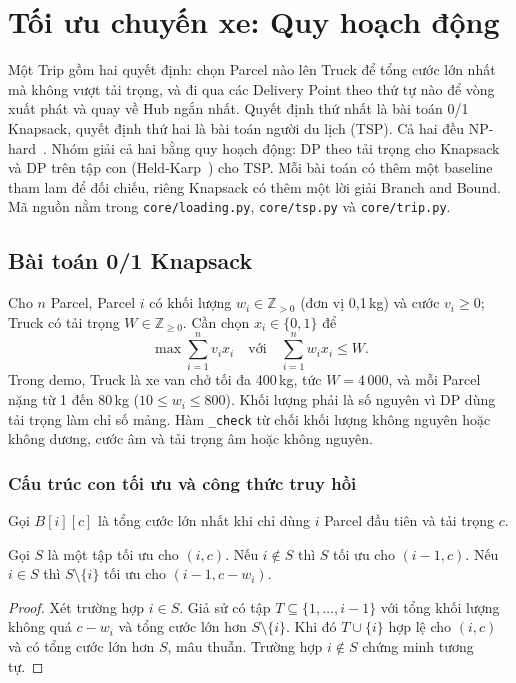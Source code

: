 \section{Tối ưu chuyến xe: Quy hoạch động}\label{sec:dp}

Một Trip gồm hai quyết định: chọn Parcel nào lên Truck để tổng cước lớn nhất mà không vượt tải trọng, và đi qua các Delivery Point theo thứ tự nào để vòng xuất phát và quay về Hub ngắn nhất. Quyết định thứ nhất là bài toán 0/1 Knapsack, quyết định thứ hai là bài toán người du lịch (TSP). Cả hai đều NP-hard~\cite{clrs2022}. Nhóm giải cả hai bằng quy hoạch động: DP theo tải trọng cho Knapsack và DP trên tập con (Held-Karp~\cite{heldkarp1962}) cho TSP. Mỗi bài toán có thêm một baseline tham lam để đối chiếu, riêng Knapsack có thêm một lời giải Branch and Bound. Mã nguồn nằm trong \texttt{core/loading.py}, \texttt{core/tsp.py} và \texttt{core/trip.py}.

\subsection{Bài toán 0/1 Knapsack}

Cho $n$ Parcel, Parcel $i$ có khối lượng $w_i \in \mathbb{Z}_{>0}$ (đơn vị 0,1\,kg) và cước $v_i \ge 0$; Truck có tải trọng $W \in \mathbb{Z}_{\ge 0}$. Cần chọn $x_i \in \{0,1\}$ để
\begin{equation}
\max \sum_{i=1}^{n} v_i x_i \quad \text{với} \quad \sum_{i=1}^{n} w_i x_i \le W .
\end{equation}
Trong demo, Truck là xe van chở tối đa 400\,kg, tức $W = 4\,000$, và mỗi Parcel nặng từ 1 đến 80\,kg ($10 \le w_i \le 800$). Khối lượng phải là số nguyên vì DP dùng tải trọng làm chỉ số mảng. Hàm \texttt{\_check} từ chối khối lượng không nguyên hoặc không dương, cước âm và tải trọng âm hoặc không nguyên.

\subsubsection{Cấu trúc con tối ưu và công thức truy hồi}
Gọi $B[i][c]$ là tổng cước lớn nhất khi chỉ dùng $i$ Parcel đầu tiên và tải trọng $c$.

\begin{lemma}\label{lem:knap}
Gọi $S$ là một tập tối ưu cho $(i, c)$. Nếu $i \notin S$ thì $S$ tối ưu cho $(i-1, c)$. Nếu $i \in S$ thì $S \setminus \{i\}$ tối ưu cho $(i-1, c - w_i)$.
\end{lemma}
\begin{proof}
Xét trường hợp $i \in S$. Giả sử có tập $T \subseteq \{1,\ldots,i-1\}$ với tổng khối lượng không quá $c - w_i$ và tổng cước lớn hơn $S \setminus \{i\}$. Khi đó $T \cup \{i\}$ hợp lệ cho $(i, c)$ và có tổng cước lớn hơn $S$, mâu thuẫn. Trường hợp $i \notin S$ chứng minh tương tự.
\end{proof}

